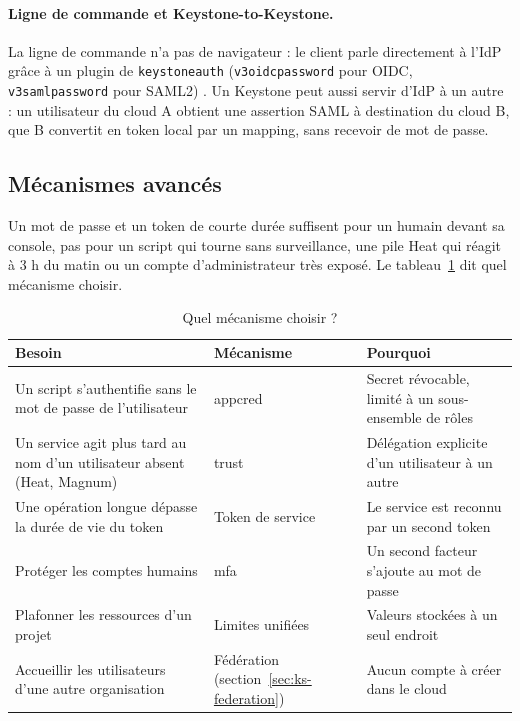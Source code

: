 \paragraph{Ligne de commande et Keystone-to-Keystone.} La ligne de commande n'a pas de navigateur : le client parle directement à l'IdP
grâce à un plugin de \texttt{keystoneauth} (\texttt{v3oidcpassword} pour OIDC, \texttt{v3samlpassword} pour SAML2) \parencite{keystone-federation}.
Un Keystone peut aussi servir d'IdP à un autre : un utilisateur du cloud A obtient une assertion SAML à destination du cloud B, que B
convertit en token local par un mapping, sans recevoir de mot de passe.

\subsection{Mécanismes avancés}\label{sec:ks-avance}

Un mot de passe et un token de courte durée suffisent pour un humain devant sa console, pas pour un script qui tourne sans
surveillance, une pile Heat qui réagit à 3 h du matin ou un compte d'administrateur très exposé. Le
tableau~\ref{tab:ks-choix} dit quel mécanisme choisir.

\begin{table}[!ht]
\centering
\renewcommand{\arraystretch}{1.25}
\begin{tabular}{@{}>{\raggedright\arraybackslash}p{6.4cm}>{\raggedright\arraybackslash}p{3.7cm}>{\raggedright\arraybackslash}p{5.4cm}@{}}
\toprule
\textbf{Besoin} & \textbf{Mécanisme} & \textbf{Pourquoi} \\
\midrule
Un script s'authentifie sans le mot de passe de l'utilisateur
  & \Gls{appcred} & Secret révocable, limité à un sous-ensemble de rôles \\
Un service agit plus tard au nom d'un utilisateur absent (Heat, Magnum)
  & \Gls{trust} & Délégation explicite d'un utilisateur à un autre \\
Une opération longue dépasse la durée de vie du token
  & Token de service & Le service est reconnu par un second token \\
Protéger les comptes humains
  & \Gls{mfa} & Un second facteur s'ajoute au mot de passe \\
Plafonner les ressources d'un projet
  & Limites unifiées & Valeurs stockées à un seul endroit \\
Accueillir les utilisateurs d'une autre organisation
  & Fédération (section~\ref{sec:ks-federation}) & Aucun compte à créer dans le cloud \\
\bottomrule
\end{tabular}
\caption{Quel mécanisme choisir ?}
\label{tab:ks-choix}
\end{table}

